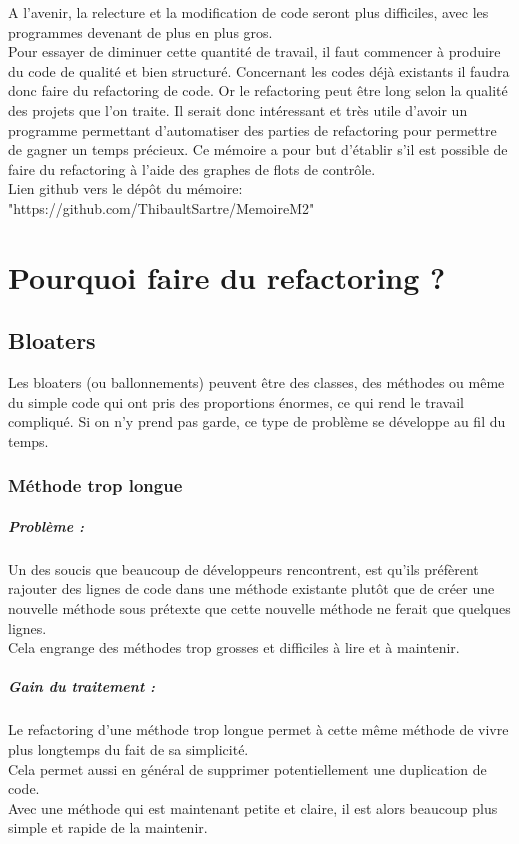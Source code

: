 \documentclass[a4paper,twoside,12pt,openright]{report}
\begin{document}
A l'avenir, la relecture et la modification de code seront plus difficiles, avec les programmes devenant de plus en plus gros.\cite{ref4}\\
Pour essayer de diminuer cette quantité de travail, il faut commencer à produire du code de qualité et bien structuré. Concernant les codes déjà existants il faudra donc faire du refactoring de code. Or le refactoring peut être long selon la qualité des projets que l'on traite. Il serait donc intéressant et très utile d'avoir un programme permettant d'automatiser des parties de refactoring pour permettre de gagner un temps précieux. 
Ce mémoire a pour but d'établir s'il est possible de faire du refactoring à l'aide des graphes de flots de contrôle.\cite{ref3}\\
Lien github vers le dépôt du mémoire: "https://github.com/ThibaultSartre/MemoireM2"\\

\chapter{Pourquoi faire du refactoring ?}
\section{Bloaters}
Les bloaters (ou ballonnements) peuvent être des classes, des méthodes ou même du simple code qui ont pris des proportions énormes, ce qui rend le travail  compliqué. Si on n'y prend pas garde, ce type de problème se développe au fil du temps.\\

\subsection{Méthode trop longue}
\paragraph{Problème :}
Un des soucis que beaucoup de développeurs rencontrent, est qu'ils préfèrent rajouter des lignes de code dans une méthode existante plutôt que de créer une nouvelle méthode sous prétexte que cette nouvelle méthode ne ferait que quelques lignes.\\
Cela engrange des méthodes trop grosses et difficiles à lire et à maintenir.\\

\paragraph{Gain du traitement :}
Le refactoring d'une méthode trop longue permet à cette même méthode de vivre plus longtemps du fait de sa simplicité.\\
Cela permet aussi en général de supprimer potentiellement une duplication de code.\\
Avec une méthode qui est maintenant petite et claire, il est alors beaucoup plus simple et rapide de la maintenir.\\
\end{document}
